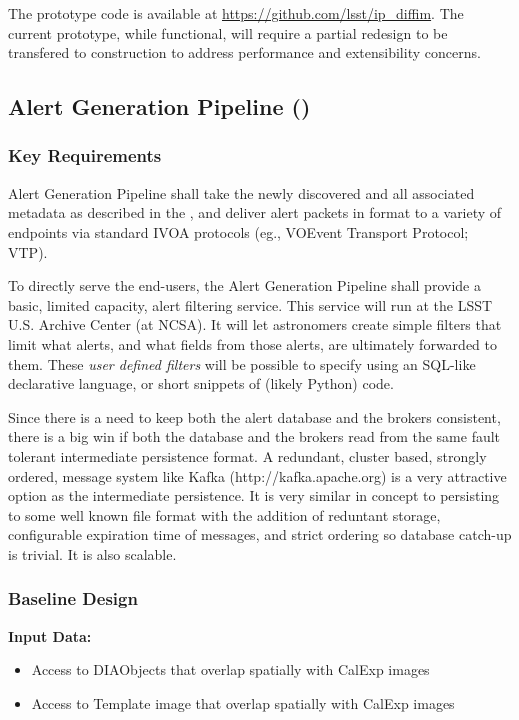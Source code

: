 The prototype code is available at \url{https://github.com/lsst/ip_diffim}. The current prototype, while functional, will require a partial redesign to be transfered to construction to address performance and extensibility concerns.

\clearpage

\subsection{Alert Generation Pipeline (\wbsAP)}

\subsubsection{Key Requirements}

Alert Generation Pipeline shall take the newly discovered \DIASources and all associated metadata as described
in the \DPDD, and deliver alert packets in \VOEvent format to a variety of endpoints via standard IVOA protocols (eg., VOEvent Transport Protocol; VTP\@).

To directly serve the end-users, the Alert Generation Pipeline shall provide a basic, limited capacity, alert filtering service. This service will run at the LSST U.S. Archive Center (at NCSA). It will let astronomers create simple filters that limit what alerts, and what fields from those alerts, are ultimately forwarded to them. These \emph{user defined filters} will be possible to specify using an SQL-like declarative language, or short snippets of (likely Python) code.

Since there is a need to keep both the alert database and the brokers consistent, there is a big win if both the database and the brokers read from the same fault tolerant intermediate persistence format.  A redundant, cluster based, strongly ordered, message system like Kafka (http://kafka.apache.org) is a very attractive option as the intermediate persistence.  It is very similar in concept to persisting to some well known file format with the addition of reduntant storage, configurable expiration time of messages, and strict ordering so database catch-up is trivial.  It is also scalable.

\subsubsection{Baseline Design}

{\bf Input Data:}\\
\begin{itemize}
\item Access to DIAObjects that overlap spatially with CalExp images
\item Access to Template image that overlap spatially with CalExp images
\end{itemize}


